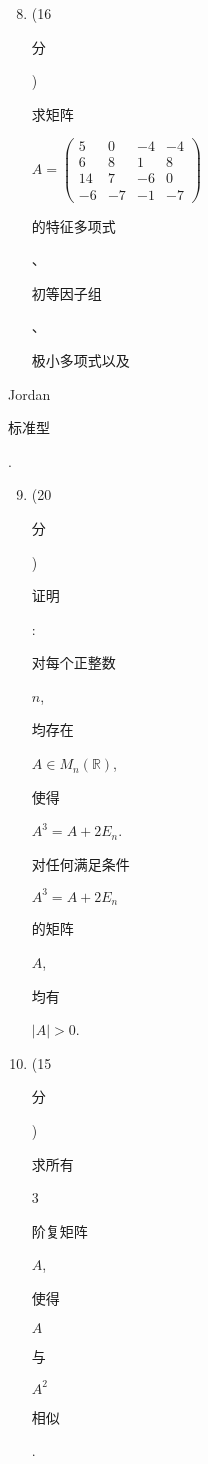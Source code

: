 \documentclass[10pt]{article}
\begin{document}
\begin{enumerate}
  \setcounter{enumi}{7}
  \item (16 \begin{CJK}{UTF8}{mj}分\end{CJK}) \begin{CJK}{UTF8}{mj}求矩阵\end{CJK} $A=\left(\begin{array}{cccc}5 & 0 & -4 & -4 \\ 6 & 8 & 1 & 8 \\ 14 & 7 & -6 & 0 \\ -6 & -7 & -1 & -7\end{array}\right)$ \begin{CJK}{UTF8}{mj}的特征多项式\end{CJK}、\begin{CJK}{UTF8}{mj}初等因子组\end{CJK}、\begin{CJK}{UTF8}{mj}极小多项式以及\end{CJK}
\end{enumerate}
Jordan \begin{CJK}{UTF8}{mj}标准型\end{CJK}.

\begin{enumerate}
  \setcounter{enumi}{8}
  \item (20 \begin{CJK}{UTF8}{mj}分\end{CJK}) \begin{CJK}{UTF8}{mj}证明\end{CJK}: \begin{CJK}{UTF8}{mj}对每个正整数\end{CJK} $n$, \begin{CJK}{UTF8}{mj}均存在\end{CJK} $A \in M_{n}(\mathbb{R})$, \begin{CJK}{UTF8}{mj}使得\end{CJK} $A^{3}=A+2 E_{n}$. \begin{CJK}{UTF8}{mj}对任何满足条件\end{CJK} $A^{3}=A+2 E_{n}$ \begin{CJK}{UTF8}{mj}的矩阵\end{CJK} $A$, \begin{CJK}{UTF8}{mj}均有\end{CJK} $|A|>0$.

  \item (15 \begin{CJK}{UTF8}{mj}分\end{CJK}) \begin{CJK}{UTF8}{mj}求所有\end{CJK} 3 \begin{CJK}{UTF8}{mj}阶复矩阵\end{CJK} $A$, \begin{CJK}{UTF8}{mj}使得\end{CJK} $A$ \begin{CJK}{UTF8}{mj}与\end{CJK} $A^{2}$ \begin{CJK}{UTF8}{mj}相似\end{CJK}.

\end{enumerate}
\end{document}
